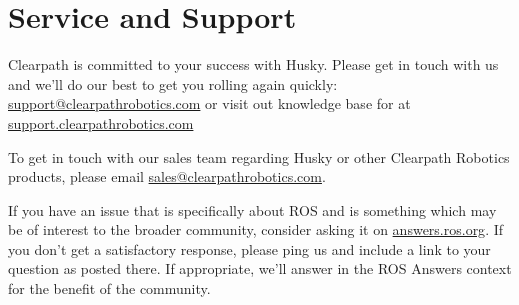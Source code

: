 \documentclass[]{clearpath-latex/clearpath-manual}
\begin{document}
\section{Service and Support}
Clearpath is committed to your success with Husky. Please get in touch with us and we'll
do our best to get you rolling again quickly: \href{mailto:support@clearpathrobotics.com}{support@clearpathrobotics.com}
or visit out knowledge base for at \href{http://support.clearpathrobotics.com}{support.clearpathrobotics.com}

To get in touch with our sales team regarding Husky or other Clearpath Robotics products, please
email \href{mailto:sales@clearpathrobotics.com}{sales@clearpathrobotics.com}.

If you have an issue that is specifically about ROS and is something which may be of interest
to the broader community, consider asking it on \href{http://answers.ros.org}{answers.ros.org}.
If you don't get a satisfactory response, please ping us and include a link to your question
as posted there. If appropriate, we'll answer in the ROS Answers context for the benefit of the
community.
\end{document}
